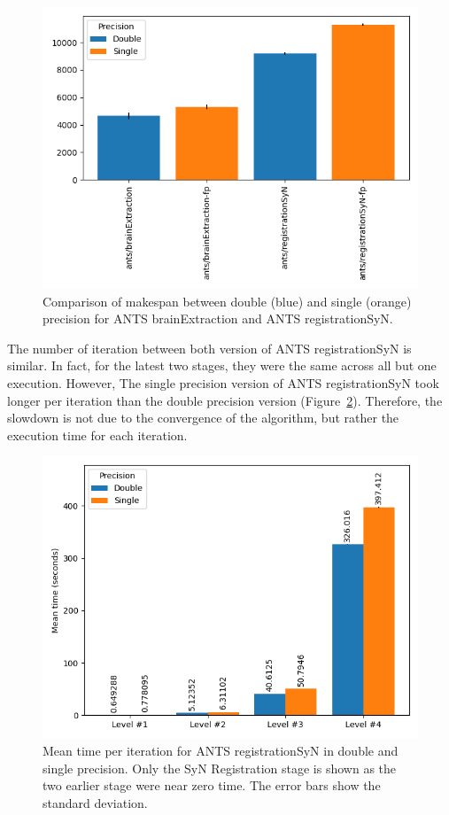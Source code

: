 \documentclass[conference]{IEEEtran}
\begin{document}
\begin{figure}[h]
	\includegraphics[width=\linewidth]{figures/makespan-ants.png}
	\caption{Comparison of makespan between double (blue) and single (orange) precision for ANTS brainExtraction and ANTS registrationSyN.}
	\label{fig:makespan-ants}
\end{figure}
			
The number of iteration between both version of ANTS registrationSyN is similar. In fact, for the latest two stages, they were the same across all but one execution. However, The single precision version of ANTS registrationSyN took longer per iteration than the double precision version (Figure~\ref{fig:mean-time-per-iteration-ants}). Therefore, the slowdown is not due to the convergence of the algorithm, but rather the execution time for each iteration.

\begin{figure}
	\includegraphics[width=\linewidth]{figures/ants-registrationSyN-iteration-mean.png}
	\caption{Mean time per iteration for ANTS registrationSyN in double and single precision. Only the SyN Registration stage is shown as the two earlier stage were near zero time. The error bars show the standard deviation.}
	\label{fig:mean-time-per-iteration-ants}
\end{figure}
						
\end{document}
